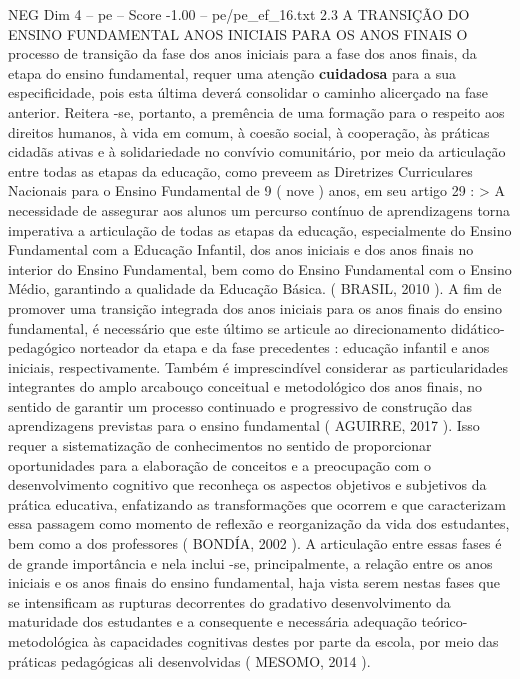 \begin{textsample}{NEG Dim 4 – pe – Score -1.00 – pe/pe\_ef\_16.txt}  \label{ex:f4_neg_015}
2.3 A TRANSIÇÃO DO ENSINO FUNDAMENTAL ANOS INICIAIS PARA OS ANOS FINAIS O processo de transição da fase dos anos iniciais para a fase dos anos finais, da etapa do ensino fundamental, requer uma atenção \textbf{cuidadosa} para a sua especificidade, pois esta última deverá consolidar o caminho alicerçado na fase anterior.
Reitera -se, portanto, a premência de uma formação para o respeito aos direitos humanos, à vida em comum, à coesão social, à cooperação, às práticas cidadãs ativas e à solidariedade no convívio comunitário, por meio da articulação entre todas as etapas da educação, como preveem as Diretrizes Curriculares Nacionais para o Ensino Fundamental de 9 ( nove ) anos, em seu artigo 29 : > A necessidade de assegurar aos alunos um percurso contínuo de aprendizagens torna imperativa a articulação de todas as etapas da educação, especialmente do Ensino Fundamental com a Educação Infantil, dos anos iniciais e dos anos finais no interior do Ensino Fundamental, bem como do Ensino Fundamental com o Ensino Médio, garantindo a qualidade da Educação Básica. ( BRASIL, 2010 ).
A fim de promover uma transição integrada dos anos iniciais para os anos finais do ensino fundamental, é necessário que este último se articule ao direcionamento didático-pedagógico norteador da etapa e da fase precedentes : educação infantil e anos iniciais, respectivamente.
Também é imprescindível considerar as particularidades integrantes do amplo arcabouço conceitual e metodológico dos anos finais, no sentido de garantir um processo continuado e progressivo de construção das aprendizagens previstas para o ensino fundamental ( AGUIRRE, 2017 ).
Isso requer a sistematização de conhecimentos no sentido de proporcionar oportunidades para a elaboração de conceitos e a preocupação com o desenvolvimento cognitivo que reconheça os aspectos objetivos e subjetivos da prática educativa, enfatizando as transformações que ocorrem e que caracterizam essa passagem como momento de reflexão e reorganização da vida dos estudantes, bem como a dos professores ( BONDÍA, 2002 ).
A articulação entre essas fases é de grande importância e nela inclui -se, principalmente, a relação entre os anos iniciais e os anos finais do ensino fundamental, haja vista serem nestas fases que se intensificam as rupturas decorrentes do gradativo desenvolvimento da maturidade dos estudantes e a consequente e necessária adequação teórico-metodológica às capacidades cognitivas destes por parte da escola, por meio das práticas pedagógicas ali desenvolvidas ( MESOMO, 2014 ).

\end{textsample}
